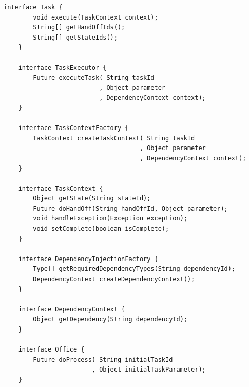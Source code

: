 \documentclass[prodmode]{style/acmlarge}
\begin{document}
\lstset{caption=Task collaboration pattern interfaces.}
\begin{lstlisting}[float,label=lst:TaskCollaborationInterfaces]
    interface Task {
        void execute(TaskContext context);
        String[] getHandOffIds();
        String[] getStateIds();
    }

    interface TaskExecutor {
        Future executeTask( String taskId 
                          , Object parameter
                          , DependencyContext context);
    }

    interface TaskContextFactory {
        TaskContext createTaskContext( String taskId
                                     , Object parameter
                                     , DependencyContext context);
    }

    interface TaskContext {
        Object getState(String stateId);
        Future doHandOff(String handOffId, Object parameter);
        void handleException(Exception exception);
        void setComplete(boolean isComplete);
    }

    interface DependencyInjectionFactory {
        Type[] getRequiredDependencyTypes(String dependencyId);
        DependencyContext createDependencyContext();
    }
    
    interface DependencyContext {
        Object getDependency(String dependencyId);
    }

    interface Office {
        Future doProcess( String initialTaskId
                        , Object initialTaskParameter);
    }
\end{lstlisting}
\end{document}
